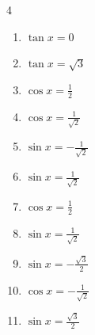 \begin{multicols}{4}
\begin{enumerate}

  \item $\displaystyle \tan{x}  = 0$


  \item $\displaystyle \tan{x}  = \sqrt{3}$


  \item $\displaystyle \cos{x}  = \frac{1}{2}$


  \item $\displaystyle \cos{x}  = \frac{1}{\sqrt{2}}$


  \item $\displaystyle \sin{x}  = -\frac{1}{\sqrt{2}}$


  \item $\displaystyle \sin{x}  = \frac{1}{\sqrt{2}}$


\columnbreak %

\resetques

  \item $\displaystyle \cos{x}  = \frac{1}{2}$


  \item $\displaystyle \sin{x}  = \frac{1}{\sqrt{2}}$


  \item $\displaystyle \sin{x}  = -\frac{\sqrt{3}}{2}$


  \item $\displaystyle \cos{x}  = -\frac{1}{\sqrt{2}}$


  \item $\displaystyle \sin{x}  = \frac{\sqrt{3}}{2}$


\end{enumerate}
\end{multicols}
